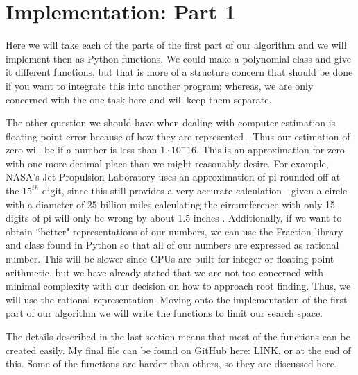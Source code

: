 \documentclass[]{article}
\theoremstyle{definition}
\begin{document}
\section{Implementation: Part 1}
Here we will take each of the parts of the first part of our algorithm and we will implement then as Python functions. We could make a polynomial class and give it different functions, but that is more of a structure concern that should be done if you want to integrate this into another program; whereas, we are only concerned with the one task here and will keep them separate. 

The other question we should have when dealing with computer estimation is floating point error because of how they are represented \cite{floating_point}. Thus our estimation of zero will be if a number is less than $1 \cdot 10^-16$. This is an approximation for zero with one more decimal place than we might reasonably desire. For example, NASA's Jet Propulsion Laboratory uses an approximation of pi rounded off at the $15^{th}$ digit, since this still provides a very accurate calculation - given a circle with a diameter of 25 billion miles calculating the circumference with only 15 digits of pi will only be wrong by about 1.5 inches \cite{jpl_pi}. Additionally, if we want to obtain ``better" representations of our numbers, we can use the Fraction library and class found in Python so that all of our numbers are expressed as rational number. This will be slower since CPUs are built for integer or floating point arithmetic, but we have already stated that we are not too concerned with minimal complexity with our decision on how to approach root finding. Thus, we will use the rational representation. Moving onto the implementation of the first part of our algorithm we will write the functions to limit our search space. 

The details described in the last section means that most of the functions can be created easily. My final file can be found on GitHub here: LINK, or at the end of this. Some of the functions are harder than others, so they are discussed here.
\end{document}

